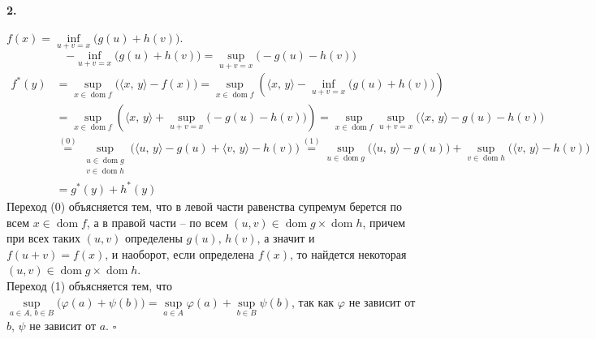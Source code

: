 \documentclass{article}
\DeclareMathOperator{\dom}{dom}
\newcommand*{\QED}{\null\nobreak\hfill\ensuremath{\square}}
\begin{document}
\paragraph{2.} $ f(x) = \inf\limits_{u + v = x} \! \big( g(u) + h(v) \big). $
\[ -\inf\limits_{u + v = x}\!\big( g(u) + h(v) \big) = \sup\limits_{u + v = x} \! \big( -g(u) - h(v) \big) \]
\[ \begin{aligned}
    f^\ast(y) &= \sup\limits_{x \in \dom f} \! \big( \langle x,\, y \rangle - f(x) \big) = \sup\limits_{x \in \dom f} \! \left( \langle x,\, y \rangle - \inf\limits_{u + v = x} \! \big( g(u) + h(v) \big) \right) \\
    &= \sup\limits_{x \in \dom f} \! \left( \langle x,\, y \rangle + \sup\limits_{u + v = x} \!\big(-g(u) - h(v)\big) \right) = \sup\limits_{x \in \dom f} \sup\limits_{u + v = x} \! \big( \langle x,\, y \rangle - g(u) - h(v) \big) \\ 
    &\overset{(0)}{=} \sup\limits_{\substack{u \in \dom g \\ v \in \dom h}} \!\big( \langle u,\, y \rangle - g(u) + \langle v,\, y \rangle - h(v) \big) \overset{(1)}{=} \sup\limits_{u \in \dom g} \!\big( \langle u,\, y \rangle - g(u) \big) + \sup\limits_{v \in \dom h} \!\big( \langle v,\, y \rangle - h(v) \big) \\
    &= g^\ast(y) + h^\ast(y)
\end{aligned} \]
Переход (0) объясняется тем, что в левой части равенства супремум берется по всем $x \in \dom f$, а в правой части -- по всем $(u, v) \in \dom g \times \dom h$, причем при всех таких $(u, v)$ определены $g(u),\, h(v)$, а значит и $f(u + v) = f(x)$, и наоборот, если определена $f(x)$, то найдется некоторая $(u, v) \in \dom g \times \dom h$. \\
Переход (1) объясняется тем, что $\sup\limits_{a \in A,\, b \in B} \! \big( \varphi(a) + \psi(b) \big) = \sup\limits_{a \in A} \varphi(a) + \sup\limits_{b \in B} \psi(b)$, так как $\varphi$ не зависит от $b$, $\psi$ не зависит от $a$. \QED
\end{document}
